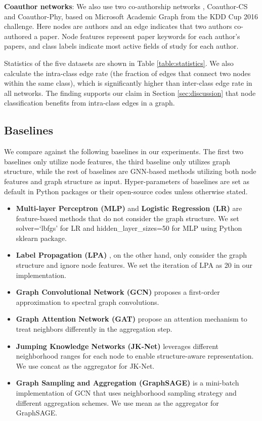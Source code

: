 \documentclass{article}
\begin{document}
		\textbf{Coauthor networks}:
		We also use two co-authorship networks \citep{shchur2018pitfalls}, Coauthor-CS and Coauthor-Phy, based on Microsoft Academic Graph from the KDD Cup 2016 challenge.
		Here nodes are authors and an edge indicates that two authors co-authored a paper.
		Node features represent paper keywords for each author's papers, and class labels indicate most active fields of study for each author.
				
		Statistics of the five datasets are shown in Table \ref{table:statistics}.
		We also calculate the intra-class edge rate (the fraction of edges that connect two nodes within the same class), which is significantly higher than inter-class edge rate in all networks.
		The finding supports our claim in Section \ref{sec:discussion} that node classification benefits from intra-class edges in a graph.
		
		
	\subsection{Baselines}
		We compare against the following baselines in our experiments.
		The first two baselines only utilize node features, the third baseline only utilizes graph structure, while the rest of baselines are GNN-based methods utilizing both node features and graph structure as input.
		Hyper-parameters of baselines are set as default in Python packages or their open-source codes unless otherwise stated.
		\begin{itemize}
			\item
				\textbf{Multi-layer Perceptron (MLP)} and \textbf{Logistic Regression (LR)} are feature-based methods that do not consider the graph structure.
				We set solver=`lbfgs' for LR and hidden\_layer\_sizes=50 for MLP using Python sklearn package.
			\item
				\textbf{Label Propagation (LPA)} \citep{zhu2005semi}, on the other hand, only consider the graph structure and ignore node features.
				We set the iteration of LPA as 20 in our implementation.
			\item
				\textbf{Graph Convolutional Network (GCN)} \citep{kipf2017semi} proposes a first-order approximation to spectral graph convolutions.
			\item
				\textbf{Graph Attention Network (GAT)} \citep{velivckovic2018graph} propose an attention mechanism to treat neighbors differently in the aggregation step.
			\item
				\textbf{Jumping Knowledge Networks (JK-Net)} \citep{xu2018representation} leverages different neighborhood ranges for each node to enable structure-aware representation. We use concat as the aggregator for JK-Net.
			\item
				\textbf{Graph Sampling and Aggregation (GraphSAGE)} \citep{hamilton2017inductive} is a mini-batch implementation of GCN that uses neighborhood sampling strategy and different aggregation schemes. We use mean as the aggregator for GraphSAGE.
		\end{itemize}
		
\end{document}
